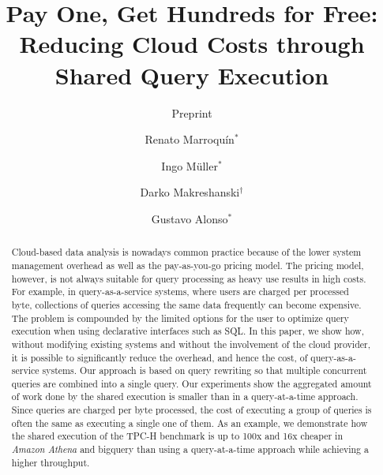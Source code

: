\documentclass[sigconf,natbib=false,screen]{acmart}
\newcommand{\athena}{{\it Amazon Athena}\xspace}
\begin{document}
\title{Pay One, Get Hundreds for Free: \\
       Reducing Cloud Costs through Shared Query Execution}
\subtitle{Preprint}

\author{Renato Marroquín$^*$}
\affiliation{}

\author{Ingo Müller$^*$}
\affiliation{}

\author{Darko Makreshanski$^\dagger$}

\author{Gustavo Alonso$^*$}
\affiliation{}

\renewcommand{\shortauthors}{R. Marroquín, I. Müller, D. Makreshanski, G. Alonso}

\hypersetup{%
    colorlinks=true,%
    urlcolor=ETHg,%
    linkcolor=ETHc,%
    citecolor=ETHd,%
    breaklinks=true,%
    pageanchor=true,%
}

\begin{abstract}

    Cloud-based data analysis is nowadays common practice because of the lower
    system management overhead as well as the pay-as-you-go pricing model. The
    pricing model, however, is not always suitable for query processing as heavy
    use results in high costs. For example, in query-as-a-service systems, where
    users are charged per processed byte, collections of queries accessing the
    same data frequently can become expensive. The problem is compounded by the
    limited options for the user to optimize query execution when using
    declarative interfaces such as SQL.  In this paper, we show how,
    without modifying existing systems and without the involvement of the cloud
    provider, it is possible to significantly reduce the overhead, and hence the
    cost, of query-as-a-service systems. Our approach is based on query
    rewriting so that multiple concurrent queries are combined into a single
    query. Our experiments show the aggregated amount of work done by the shared
    execution is smaller than in a query-at-a-time approach. Since queries are
    charged per byte processed, the cost of executing a group of queries is
    often the same as executing a single one of them. As an example, we
    demonstrate how the shared execution of the TPC-H benchmark is up to 100x
    and 16x cheaper in \athena and bigquery than using a query-at-a-time
    approach while achieving a higher throughput.


\end{abstract}
\end{document}
